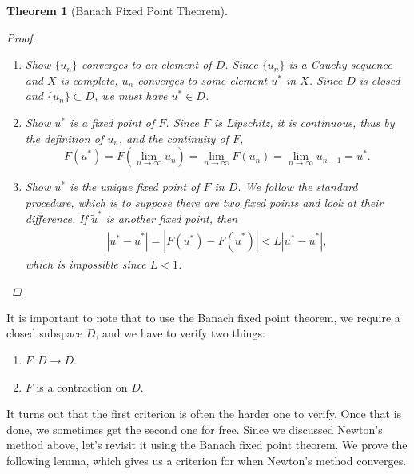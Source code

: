 \documentclass[12pt]{amsart}         %
\newtheorem{theorem}{Theorem}[section]
\theoremstyle{remark}
\begin{document}
\begin{theorem}[Banach Fixed Point Theorem]
\begin{proof}
\begin{enumerate}
	\item Show $\{ u_n \}$ converges to an element of $D$. Since $\{ u_n \}$ is a Cauchy sequence and $X$ is complete, $u_n$ converges to some element $u^*$ in $X$. Since $D$ is closed and $\{u_n\} \subset D$, we must have $u^* \in D$.
	
	\item Show $u^*$ is a fixed point of $F$. Since $F$ is Lipschitz, it is continuous, thus by the definition of $u_n$, and the continuity of $F$,
	\[
	F(u^*) = F\left(\lim_{n\rightarrow \infty} u_n\right) = \lim_{n \rightarrow \infty} F(u_n) 
	= \lim_{n \rightarrow \infty} u_{n+1} = u^*.
	\]

	\item Show $u^*$ is the unique fixed point of $F$ in $D$. We follow the standard procedure, which is to suppose there are two fixed points and look at their difference. If $\tilde{u}^*$ is another fixed point, then
	\begin{align*}
	|u^* - \tilde{u}^*| = |F(u^*) - F(\tilde{u}^*)| < L|u^* - \tilde{u}^*|,
	\end{align*}
	which is impossible since $L < 1$.
\end{enumerate}
\end{proof}
\end{theorem}

It is important to note that to use the Banach fixed point theorem, we require a closed subspace $D$, and we have to verify two things:
\begin{enumerate}
    \item $F: D \rightarrow D$.
    \item $F$ is a contraction on $D$.
\end{enumerate}
It turns out that the first criterion is often the harder one to verify. Once that is done, we sometimes get the second one for free. Since we discussed Newton's method above, let's revisit it using the Banach fixed point theorem. We prove the following lemma, which gives us a criterion for when Newton's method converges.
\end{document}
